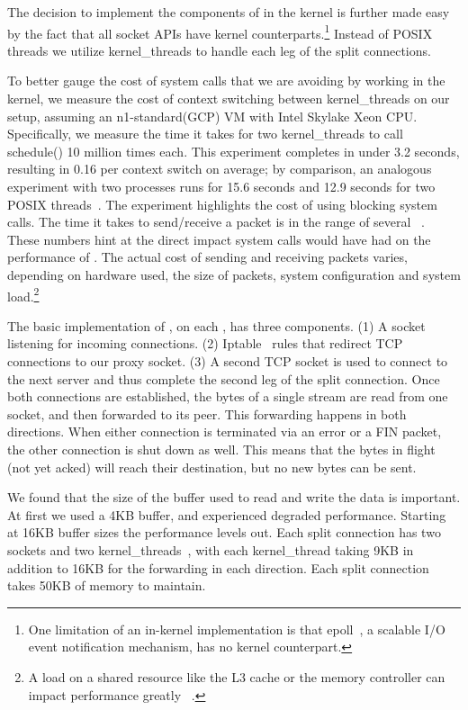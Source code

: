 The decision to implement the components of \oursys in the kernel is further made easy by the fact that all socket APIs have kernel counterparts.\footnote{One limitation of an in-kernel implementation is that epoll~\cite{epoll}, a scalable I/O event notification mechanism, has no kernel counterpart.} Instead of POSIX threads we utilize kernel\_threads to handle each leg of the split connections. 


To better gauge the cost of system calls that we are avoiding by working in the kernel, we  measure the cost of context switching between kernel\_threads on our setup, assuming an n1-standard(GCP) VM with Intel Skylake Xeon CPU. Specifically, we measure the time it takes for two kernel\_threads to call schedule() 10 million times each. This experiment completes in under 3.2 seconds, resulting in 0.16 \usec per context switch on average; by comparison, an analogous experiment with two processes runs for 15.6 seconds and 12.9 seconds for two POSIX threads~\cite{pthreads}. The experiment highlights the cost of using blocking system calls. The time it takes to send/receive a packet is in the range of several \usec ~\cite{Copy}. These numbers hint at the direct impact system calls would have had on the performance of \oursys. The actual cost of sending and receiving packets varies, depending on hardware used, the size of packets, system configuration and system load.\footnote{A load on a shared resource like the L3 cache or the memory controller can impact performance greatly ~\cite{Damn}.}


 The basic implementation of \oursys, on each \relay, has three components. (1) A socket listening for incoming connections. (2) Iptable~\cite{iptables} rules that redirect TCP connections to our proxy socket. (3) A second TCP socket is used to connect to the next server and thus complete the second leg of the split connection. Once both connections are established, the bytes of a single stream are read from one socket, and then forwarded to its peer. This forwarding happens in both directions. When either connection is terminated via an error or a FIN packet, the other connection is shut down as well. This means that the bytes in flight (\ie not yet acked) will reach their destination, but no new bytes can be sent.

 We found that the size of the buffer used to read and write the data is important. At first we used  a 4KB buffer, and experienced degraded performance. Starting at 16KB buffer sizes the performance levels out. Each split connection has two sockets and two kernel\_threads~\cite{kthread}, with  each kernel\_thread taking 9KB in addition to 16KB for the forwarding in each direction. Each split connection takes 50KB of memory to maintain.


